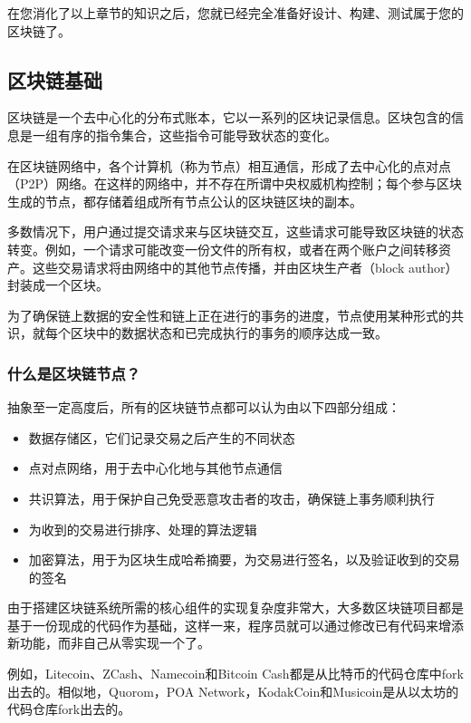 在您消化了以上章节的知识之后，您就已经完全准备好设计、构建、测试属于您的区块链了。

\subsection{区块链基础}

区块链是一个去中心化的分布式账本，它以一系列的区块记录信息。区块包含的信息是一组有序的指令集合，这些指令可能导致状态的变化。

在区块链网络中，各个计算机（称为节点）相互通信，形成了去中心化的点对点（P2P）网络。在这样的网络中，并不存在所谓中央权威机构控制；每个参与区块生成的节点，都存储着组成所有节点公认的区块链区块的副本。

多数情况下，用户通过提交请求来与区块链交互，这些请求可能导致区块链的状态转变。例如，一个请求可能改变一份文件的所有权，或者在两个账户之间转移资产。这些交易请求将由网络中的其他节点传播，并由区块生产者（block
author）封装成一个区块。

为了确保链上数据的安全性和链上正在进行的事务的进度，节点使用某种形式的共识，就每个区块中的数据状态和已完成执行的事务的顺序达成一致。

\hypertarget{ux4ec0ux4e48ux662fux533aux5757ux94feux8282ux70b9}{%
\subsubsection{什么是区块链节点？}\label{ux4ec0ux4e48ux662fux533aux5757ux94feux8282ux70b9}}

抽象至一定高度后，所有的区块链节点都可以认为由以下四部分组成：

\begin{itemize}
\item
  数据存储区，它们记录交易之后产生的不同状态
\item
  点对点网络，用于去中心化地与其他节点通信
\item
  共识算法，用于保护自己免受恶意攻击者的攻击，确保链上事务顺利执行
\item
  为收到的交易进行排序、处理的算法逻辑
\item
  加密算法，用于为区块生成哈希摘要，为交易进行签名，以及验证收到的交易的签名
\end{itemize}

由于搭建区块链系统所需的核心组件的实现复杂度非常大，大多数区块链项目都是基于一份现成的代码作为基础，这样一来，程序员就可以通过修改已有代码来增添新功能，而非自己从零实现一个了。

例如，Litecoin、ZCash、Namecoin和Bitcoin
Cash都是从比特币的代码仓库中fork出去的。相似地，Quorom，POA
Network，KodakCoin和Musicoin是从以太坊的代码仓库fork出去的。

